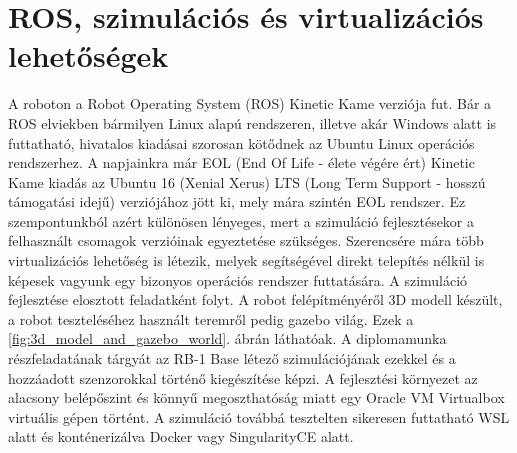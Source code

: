 \section{ROS, szimulációs és virtualizációs lehetőségek}
A roboton a Robot Operating System (ROS) Kinetic Kame verziója fut. Bár a ROS elviekben bármilyen Linux alapú rendszeren, illetve akár Windows alatt is futtatható, hivatalos kiadásai szorosan kötődnek az Ubuntu Linux operációs rendszerhez. A napjainkra már EOL (End Of Life - élete végére ért) Kinetic Kame kiadás az Ubuntu 16 (Xenial Xerus) LTS (Long Term Support - hosszú támogatási idejű) verziójához jött ki, mely mára szintén EOL rendszer. Ez szempontunkból azért különösen lényeges, mert a szimuláció fejlesztésekor a felhasznált csomagok verzióinak egyeztetése szükséges. Szerencsére mára több virtualizációs lehetőség is létezik, melyek segítségével direkt telepítés nélkül is képesek vagyunk egy bizonyos operációs rendszer futtatására. A szimuláció fejlesztése elosztott feladatként folyt. A robot felépítményéről 3D modell készült, a robot teszteléséhez használt teremről pedig gazebo világ. Ezek a \ref{fig:3d_model_and_gazebo_world}. ábrán láthatóak. A diplomamunka részfeladatának tárgyát az RB-1 Base létező szimulációjának ezekkel és a hozzáadott szenzorokkal történő kiegészítése képzi. A fejlesztési környezet az alacsony belépőszint és könnyű megoszthatóság miatt egy Oracle VM Virtualbox\cite{noauthor_oracle_nodate} virtuális gépen történt. A szimuláció továbbá tesztelten sikeresen futtatható WSL\cite{craigloewen-msft_wsl_nodate} alatt és konténerizálva Docker\cite{noauthor_docker_nodate} vagy SingularityCE\cite{noauthor_singularityce_nodate} alatt.

